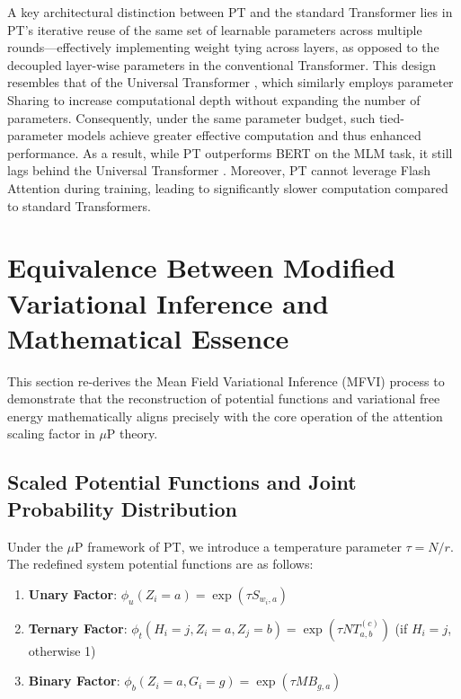 \documentclass[11pt]{article}
\begin{document}
A key architectural distinction between PT and the standard Transformer lies in PT’s iterative reuse of the same set of learnable parameters across multiple rounds—effectively implementing weight tying across layers, as opposed to the decoupled layer-wise parameters in the conventional Transformer. This design resembles that of the Universal Transformer \cite{dehghani2019universal}, which similarly employs parameter Sharing to increase computational depth without expanding the number of parameters. Consequently, under the same parameter budget, such tied-parameter models achieve greater effective computation and thus enhanced performance. As a result, while PT outperforms BERT \cite{devlin2019bert} on the MLM task, it still lags behind the Universal Transformer \cite{dehghani2019universal}.
Moreover, PT cannot leverage Flash Attention \cite{dao2022flashattention} during training, leading to significantly slower computation compared to standard Transformers.

%
% 


\appendix

\section{Equivalence Between Modified Variational Inference and Mathematical Essence}\label{app:A}
This section re-derives the Mean Field Variational Inference (MFVI) process to demonstrate that the reconstruction of potential functions and variational free energy mathematically aligns precisely with the core operation of the attention scaling factor in $\mu$P theory.

\subsection{Scaled Potential Functions and Joint Probability Distribution}

Under the $\mu$P framework of PT, we introduce a temperature parameter $\tau = N/r$. The redefined system potential functions are as follows:
\begin{enumerate}
    \item \textbf{Unary Factor}: $\phi_u(Z_i=a) = \exp(\tau S_{w_i, a})$
    \item \textbf{Ternary Factor}: $\phi_t(H_i=j, Z_i=a, Z_j=b) = \exp(\tau N T_{a,b}^{(c)})$ (if $H_i=j$, otherwise 1)
    \item \textbf{Binary Factor}: $\phi_b(Z_i=a, G_i=g) = \exp(\tau M B_{g,a})$
\end{enumerate}
\end{document}

